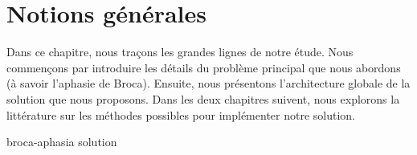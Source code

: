 \chapter{Notions générales}

Dans ce chapitre, nous traçons les grandes lignes de notre étude.
Nous commençons par introduire les détails du problème principal que nous abordons 
(à savoir l'aphasie de Broca).
Ensuite, nous présentons l'architecture globale de la solution que nous proposons.
Dans les deux chapitres suivent, 
nous explorons la littérature sur les méthodes possibles pour implémenter notre solution.

{broca-aphasia}
{solution}